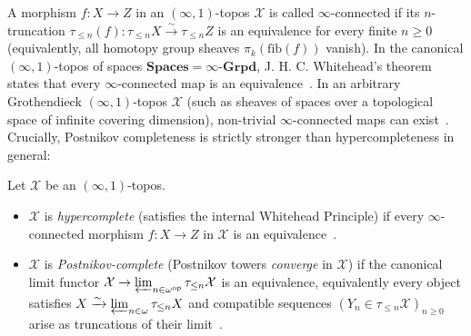 A morphism $f: X \to Z$ in an $(\infty, 1)$-topos $\mathcal{X}$ is called $\infty$-connected if its $n$-truncation $\tau_{\le n}(f): \tau_{\le n}X \xrightarrow{\sim} \tau_{\le n}Z$ is an equivalence for every finite $n \ge 0$ (equivalently, all homotopy group sheaves $\pi_k(\mathrm{fib}(f))$ vanish). In the canonical $(\infty, 1)$-topos of spaces $\mathbf{Spaces} = \infty\text{-}\mathbf{Grpd}$, J. H. C. Whitehead's theorem states that every $\infty$-connected map is an equivalence~\cite[\S 6.5.2]{Lurie09}. In an arbitrary Grothendieck $(\infty, 1)$-topos $\mathcal{X}$ (such as sheaves of spaces over a topological space of infinite covering dimension), non-trivial $\infty$-connected maps can exist~\cite[\S 6.5.4, \S 7.2.1]{Lurie09}. Crucially, Postnikov completeness is strictly stronger than hypercompleteness in general:

\begin{definition}\label{def:hypercomplete}

Let $\mathcal{X}$ be an $(\infty, 1)$-topos.

\begin{itemize}

  \item $\mathcal{X}$ is \emph{hypercomplete} (satisfies the internal Whitehead Principle) if every $\infty$-connected morphism $f: X \to Z$ in $\mathcal{X}$ is an equivalence~\cite[\S 6.5.2]{Lurie09}.

  \item $\mathcal{X}$ is \emph{Postnikov-complete} (Postnikov towers \emph{converge} in $\mathcal{X}$) if the canonical limit functor $\mathcal{X} \to \varprojlim_{n \in \omega^{\mathrm{op}}} \tau_{\le n}\mathcal{X}$ is an equivalence, equivalently every object satisfies $X \xrightarrow{\sim} \varprojlim_{n \in \omega} \tau_{\le n}X$ and compatible sequences $(Y_n \in \tau_{\le n}\mathcal{X})_{n \ge 0}$ arise as truncations of their limit~\cite[\S 5.5.6, \S 7.2.1]{Lurie09}.

\end{itemize}

\end{definition}

